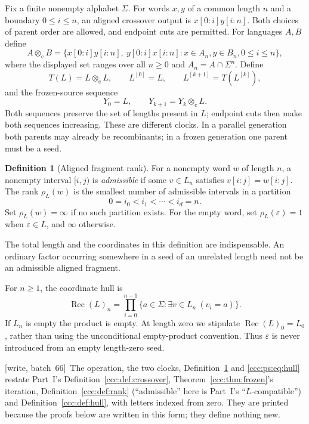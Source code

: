 \documentclass[11pt,letterpaper]{article}
\theoremstyle{definition}
\newtheorem{definition}[theorem]{Definition}
\theoremstyle{remark}
\newcommand{\eps}{\varepsilon}
\newcommand{\rec}{\operatorname{Rec}}
\newcommand{\cut}{\otimes_{\mathrm c}}
\newcommand{\gen}[2]{#1^{[#2]}}
\newcommand{\rank}{\rho}
\newcommand{\wsix}{\textup{[write, batch~66]}}
\begin{document}
Fix a finite nonempty alphabet $\Sigma$. For words $x,y$ of a common length
$n$ and a boundary $0\le i\le n$, an aligned crossover output is
$x[0:i]y[i:n]$. Both choices of parent order are allowed, and endpoint cuts
are permitted. For languages $A,B$ define
\[
 A\cut B=\{x[0:i]y[i:n],\ y[0:i]x[i:n]:
                  x\in A_n,
                  y\in B_n,
                  0\le i\le n\},
\]
where the displayed set ranges over all $n\ge0$ and $A_n=A\cap\Sigma^n$.
Define
\[
 T(L)=L\cut L,\qquad \gen L0=L,\qquad
 \gen L{k+1}=T(\gen Lk),
\]
and the frozen-source sequence
\[
 Y_0=L,\qquad Y_{k+1}=Y_k\cut L.
\]
Both sequences preserve the set of lengths present in $L$; endpoint cuts
then make both sequences increasing. These are different clocks. In a parallel generation both parents may
already be recombinants; in a frozen generation one parent must be a seed.

\begin{definition}[Aligned fragment rank]\label{ccc:ps:def:rank}
For a nonempty word $w$ of length $n$, a nonempty interval $[i,j)$ is
\emph{admissible} if some $v\in L_n$ satisfies $v[i:j]=w[i:j]$.
The rank $\rank_L(w)$ is the smallest number of admissible intervals in a
partition
\[
 0=i_0<i_1<\cdots<i_d=n.
\]
Set $\rank_L(w)=\infty$ if no such partition exists. For the empty word,
set $\rank_L(\eps)=1$ when $\eps\in L$, and $\infty$ otherwise.
\end{definition}

The total length and the coordinates in this definition are indispensable.
An ordinary factor occurring somewhere in a seed of an unrelated length
need not be an admissible aligned fragment.

For $n\ge1$, the coordinate hull is
\begin{equation}\label{ccc:ps:eq:hull}
 \rec(L)_n=\prod_{i=0}^{n-1}\{a\in\Sigma:
                         \exists v\in L_n\ (v_i=a)\}.
\end{equation}
If $L_n$ is empty the product is empty. At length zero we stipulate
$\rec(L)_0=L_0$, rather than using the unconditional empty-product
convention. Thus $\eps$ is never introduced from an empty length-zero seed.

\wsix\ The operation, the two clocks, Definition~\ref{ccc:ps:def:rank} and
\eqref{ccc:ps:eq:hull} restate Part~I's Definition~\ref{ccc:def:crossover},
Theorem~\ref{ccc:thm:frozen}'s iteration, Definition~\ref{ccc:def:rank}
(``admissible'' here is Part~I's ``$L$-compatible'') and
Definition~\ref{ccc:def:hull}, with letters indexed from zero. They are
printed because the proofs below are written in this form; they define
nothing new.
\end{document}

